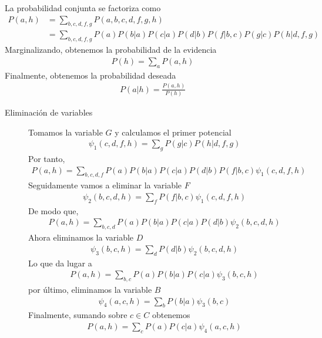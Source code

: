 \documentclass[12pt,a4paper]{article}
\begin{document}
La probabilidad conjunta se factoriza como
\begin{align*}
    P(a, h) & = \sum_{b, c, d, f, g} P(a, b, c, d, f, g, h) \\
    & = \sum_{b, c, d, f, g} P(a) P(b | a) P(c | a) P(d | b) P(f | b, c) P(g | c) P(h | d, f, g) 
\end{align*}
Marginalizando, obtenemos la probabilidad de la evidencia
\begin{align*}
    P(h) = \sum_a P(a, h)
\end{align*}
Finalmente, obtenemos la probabilidad deseada
\begin{align*}
    P(a | h) = \frac{P(a, h)}{P(h)}
\end{align*}
\begin{description}
    \item[Eliminación de variables] Tomamos la variable $G$ y calculamos el primer potencial 
    \begin{align*}
        \psi_1(c, d, f, h) = \sum_g P(g | c) P(h | d, f, g)
    \end{align*}
    Por tanto,
    \begin{align*}
        P(a, h) = \sum_{b, c, d, f} P(a) P(b | a) P(c | a) P(d | b) P(f | b, c) \psi_1(c, d, f, h)
    \end{align*}
    Seguidamente vamos a eliminar la variable $F$
    \begin{align*}
        \psi_2(b, c, d, h) = \sum_f P(f | b, c) \psi_1(c, d, f, h)
    \end{align*}
    De modo que,
    \begin{align*}
        P(a, h) = \sum_{b, c, d} P(a) P(b | a) P(c | a) P(d | b) \psi_2(b, c, d, h)
    \end{align*}
    Ahora eliminamos la variable $D$
    \begin{align*}
        \psi_3(b, c, h) = \sum_d P(d | b) \psi_2(b, c, d, h)
    \end{align*}
    Lo que da lugar a 
    \begin{align*}
        P(a, h) = \sum_{b, c} P(a) P(b | a) P(c | a) \psi_3(b, c, h)
    \end{align*}
    por último, eliminamos la variable $B$
    \begin{align*}
        \psi_4(a, c, h) = \sum_b P(b | a) \psi_3(b, c)
    \end{align*}
    Finalmente, sumando sobre $c \in C$ obtenemos
    \begin{align*}
        P(a, h) = \sum_{c} P(a) P(c | a) \psi_4(a, c, h)
    \end{align*}

\end{description}
\end{document}
